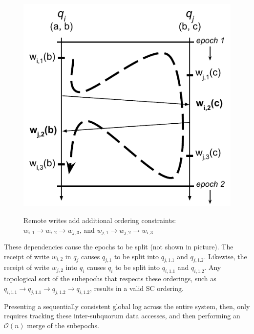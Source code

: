 \begin{figure}
    \begin{center}
        \includegraphics[width=5in]{figures/ch03_event_ordering_remote_write.pdf}
    \end{center}
    \renewcommand{\baselinestretch}{1}
    \small\normalsize

    \begin{quote}
        \caption[Event Ordering with Remote Writes in HC]{Remote writes add additional ordering constraints: $w_{i,1} \rightarrow w_{i,2}\rightarrow w_{j,3}$, and $ w_{j,1} \rightarrow w_{j,2} \rightarrow w_{i,3}$}
        \label{fig:ch03_event_ordering_remote_write}
    \end{quote}
\end{figure}
\renewcommand{\baselinestretch}{2}
\small\normalsize

These dependencies cause the epochs to be split (not shown in picture).
The receipt of write $w_{i,2}$ in $q_j$ causes $q_{j,1}$ to be split into
$q_{j,1.1}$ and $q_{j,1.2}$.
Likewise, the receipt of write $w_{j,2}$ into $q_i$ causes $q_i$ to be split
into $q_{i,1.1}$ and $q_{i,1.2}$.
Any topological sort of the subepochs that respects these orderings, such as
$q_{i,1.1} \rightarrow q_{j,1.1} \rightarrow q_{j,1.2} \rightarrow q_{i,1.2}$,
results in a valid SC ordering.

Presenting a sequentially consistent global log across the entire system, then, only requires tracking these inter-subquorum data accesses, and then performing an $\mathcal{O}(n)$ merge of the subepochs.

